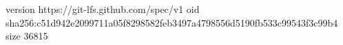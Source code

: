 version https://git-lfs.github.com/spec/v1
oid sha256:c51d942e2099711a05f8298582feb3497a4798556d5190fb533c99543f3c99b4
size 36815
